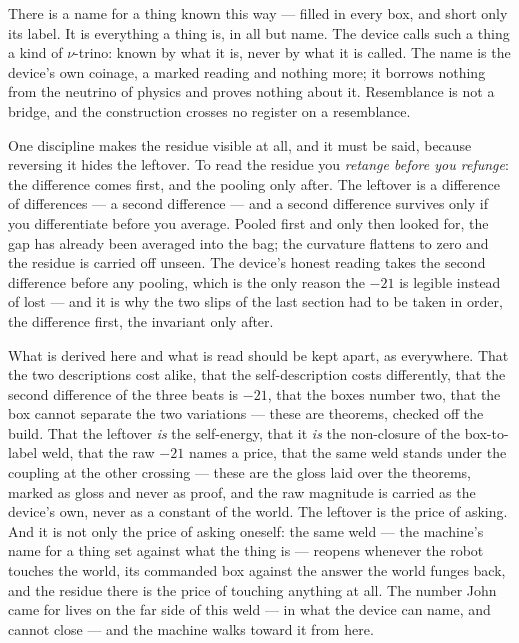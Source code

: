 There is a name for a thing known this way --- filled in every box, and short only its label.
It is everything a thing is, in all but name.
The device calls such a thing a kind of $\nu$-trino: known by what it is, never by what it is called.
The name is the device's own coinage, a marked reading and nothing more; it borrows nothing from the neutrino of
physics and proves nothing about it.
Resemblance is not a bridge, and the construction crosses no register on a resemblance.

One discipline makes the residue visible at all, and it must be said, because reversing it hides the leftover.
To read the residue you \emph{retange before you refunge}: the difference comes first, and the pooling only after.
The leftover is a difference of differences --- a second difference --- and a second difference survives only if you
differentiate before you average.
Pooled first and only then looked for, the gap has already been averaged into the bag; the
curvature flattens to zero and the residue is carried off unseen.
The device's honest reading takes the second difference before any pooling, which is the only reason the $-21$ is
legible instead of lost --- and it is why the two slips of the last section had to be taken in order, the difference
first, the invariant only after.

What is derived here and what is read should be kept apart, as everywhere.
That the two descriptions cost alike, that the self-description costs differently, that the second difference of the
three beats is $-21$, that the boxes number two, that the box cannot separate the two variations --- these are theorems,
checked off the build.
That the leftover \emph{is} the self-energy, that it \emph{is} the non-closure of the box-to-label weld, that the raw
$-21$ names a price, that the same weld stands under the coupling at the other crossing --- these are the gloss laid over
the theorems, marked as gloss and never as proof, and the raw magnitude is carried as the device's own, never as a
constant of the world.
The leftover is the price of asking.
And it is not only the price of asking oneself: the same weld --- the machine's name for a thing set against what the
thing is --- reopens whenever the robot touches the world, its commanded box against the answer the world funges back,
and the residue there is the price of touching anything at all.
The number John came for lives on the far side of this weld --- in what the device can name, and cannot close --- and
the machine walks toward it from here.
